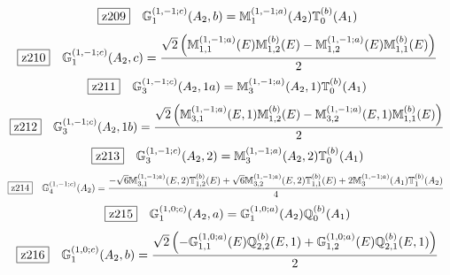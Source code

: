 \documentclass[fleqn,10pt,landscape]{jsarticle}
\begin{document}
\begin{dmath*}
\hspace*{3mm}\fbox{z209}\quad \mathbb{G}_{1}^{(1,-1;c)}(A_{2},b)=\mathbb{M}_{1}^{(1,-1;a)}(A_{2}) \mathbb{T}_{0}^{(b)}(A_{1})
\end{dmath*}
\begin{dmath*}
\hspace*{3mm}\fbox{z210}\quad \mathbb{G}_{1}^{(1,-1;c)}(A_{2},c)=\frac{\sqrt{2} \left(\mathbb{M}_{1,1}^{(1,-1;a)}(E) \mathbb{M}_{1,2}^{(b)}(E) - \mathbb{M}_{1,2}^{(1,-1;a)}(E) \mathbb{M}_{1,1}^{(b)}(E)\right)}{2}
\end{dmath*}
\begin{dmath*}
\hspace*{3mm}\fbox{z211}\quad \mathbb{G}_{3}^{(1,-1;c)}(A_{2},1a)=\mathbb{M}_{3}^{(1,-1;a)}(A_{2},1) \mathbb{T}_{0}^{(b)}(A_{1})
\end{dmath*}
\begin{dmath*}
\hspace*{3mm}\fbox{z212}\quad \mathbb{G}_{3}^{(1,-1;c)}(A_{2},1b)=\frac{\sqrt{2} \left(\mathbb{M}_{3,1}^{(1,-1;a)}(E,1) \mathbb{M}_{1,2}^{(b)}(E) - \mathbb{M}_{3,2}^{(1,-1;a)}(E,1) \mathbb{M}_{1,1}^{(b)}(E)\right)}{2}
\end{dmath*}
\begin{dmath*}
\hspace*{3mm}\fbox{z213}\quad \mathbb{G}_{3}^{(1,-1;c)}(A_{2},2)=\mathbb{M}_{3}^{(1,-1;a)}(A_{2},2) \mathbb{T}_{0}^{(b)}(A_{1})
\end{dmath*}
\begin{dmath*}
\hspace*{3mm}\fbox{z214}\quad \mathbb{G}_{4}^{(1,-1;c)}(A_{2})=\frac{- \sqrt{6} \mathbb{M}_{3,1}^{(1,-1;a)}(E,2) \mathbb{T}_{1,2}^{(b)}(E) + \sqrt{6} \mathbb{M}_{3,2}^{(1,-1;a)}(E,2) \mathbb{T}_{1,1}^{(b)}(E) + 2 \mathbb{M}_{3}^{(1,-1;a)}(A_{1}) \mathbb{T}_{1}^{(b)}(A_{2})}{4}
\end{dmath*}
\begin{dmath*}
\hspace*{3mm}\fbox{z215}\quad \mathbb{G}_{1}^{(1,0;c)}(A_{2},a)=\mathbb{G}_{1}^{(1,0;a)}(A_{2}) \mathbb{Q}_{0}^{(b)}(A_{1})
\end{dmath*}
\begin{dmath*}
\hspace*{3mm}\fbox{z216}\quad \mathbb{G}_{1}^{(1,0;c)}(A_{2},b)=\frac{\sqrt{2} \left(- \mathbb{G}_{1,1}^{(1,0;a)}(E) \mathbb{Q}_{2,2}^{(b)}(E,1) + \mathbb{G}_{1,2}^{(1,0;a)}(E) \mathbb{Q}_{2,1}^{(b)}(E,1)\right)}{2}
\end{dmath*}
\end{document}
